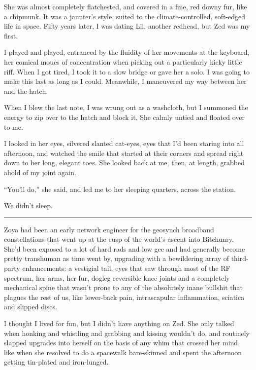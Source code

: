 She was almost completely flatchested, and covered in a fine, red
downy fur, like a chipmunk. It was a jaunter's style, suited to the
climate-controlled, soft-edged life in space. Fifty years later, I
was dating Lil, another redhead, but Zed was my first.

I played and played, entranced by the fluidity of her movements at
the keyboard, her comical moues of concentration when picking out a
particularly kicky little riff. When I got tired, I took it to a
slow bridge or gave her a solo. I was going to make this last as
long as I could. Meanwhile, I maneuvered my way between her and the
hatch.

When I blew the last note, I was wrung out as a washcloth, but I
summoned the energy to zip over to the hatch and block it. She
calmly untied and floated over to me.

I looked in her eyes, silvered slanted cat-eyes, eyes that I'd been
staring into all afternoon, and watched the smile that started at
their corners and spread right down to her long, elegant toes. She
looked back at me, then, at length, grabbed ahold of my joint
again.

“You'll do,” she said, and led me to her sleeping quarters, across
the station.

We didn't sleep.

\begin{center}\rule{3in}{0.4pt}\end{center}

Zoya had been an early network engineer for the geosynch broadband
constellations that went up at the cusp of the world's ascent into
Bitchunry. She'd been exposed to a lot of hard rads and low gee and
had generally become pretty transhuman as time went by, upgrading
with a bewildering array of third-party enhancements: a vestigial
tail, eyes that saw through most of the RF spectrum, her arms, her
fur, dogleg reversible knee joints and a completely mechanical
spine that wasn't prone to any of the absolutely inane bullshit
that plagues the rest of us, like lower-back pain, intrascapular
inflammation, sciatica and slipped discs.

I thought I lived for fun, but I didn't have anything on Zed. She
only talked when honking and whistling and grabbing and kissing
wouldn't do, and routinely slapped upgrades into herself on the
basis of any whim that crossed her mind, like when she resolved to
do a spacewalk bare-skinned and spent the afternoon getting
tin-plated and iron-lunged.

